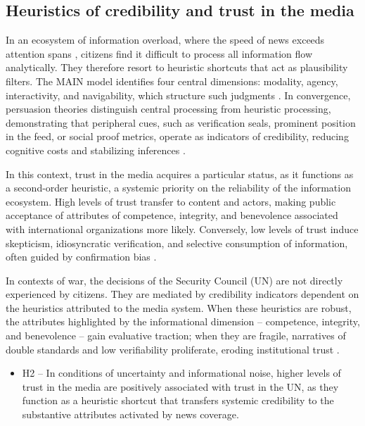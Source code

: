 \documentclass[english]{textolivre}
\begin{document}
\subsection{Heuristics of credibility and trust in the media}
In an ecosystem of information overload, where the speed of news exceeds attention spans \cite{fan2021}, citizens find it difficult to process all information flow analytically. They therefore resort to heuristic shortcuts \cite{dale2015} that act as plausibility filters. The MAIN model identifies four central dimensions: modality, agency, interactivity, and navigability, which structure such judgments \cite{sundar2008}. In convergence, persuasion theories distinguish central processing from heuristic processing, demonstrating that peripheral cues, such as verification seals, prominent position in the feed, or social proof metrics, operate as indicators of credibility, reducing cognitive costs and stabilizing inferences \cite{petty1986}.

In this context, trust in the media acquires a particular status, as it functions as a second-order heuristic, a systemic priority on the reliability of the information ecosystem. High levels of trust transfer to content and actors, making public acceptance of attributes of competence, integrity, and benevolence associated with international organizations more likely. Conversely, low levels of trust induce skepticism, idiosyncratic verification, and selective consumption of information, often guided by confirmation bias \cite{tsfati2003, kohring2007}.

In contexts of war, the decisions of the Security Council (UN) are not directly experienced by citizens. They are mediated by credibility indicators dependent on the heuristics attributed to the media system. When these heuristics are robust, the attributes highlighted by the informational dimension -- competence, integrity, and benevolence -- gain evaluative traction; when they are fragile, narratives of double standards and low verifiability proliferate, eroding institutional trust \cite{oreskes2019}.

\begin{itemize}
    \item H2 -- In conditions of uncertainty and informational noise, higher levels of trust in the media are positively associated with trust in the UN, as they function as a heuristic shortcut that transfers systemic credibility to the substantive attributes activated by news coverage.
\end{itemize}
\end{document}
